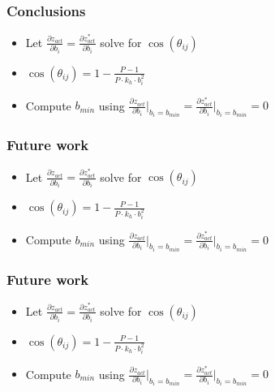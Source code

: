 \documentclass[xcolor=svgnames]{beamer}
\begin{document}
	\begin{frame}
	\frametitle{Conclusions}
	\begin{itemize}
	\item Let $\frac{\partial z_{act}}{\partial b_i} = \frac{\partial z_{act}^*}{\partial b_i}$ solve for $\cos (\theta_{ij})$
	\item $\cos (\theta_{ij}) = 1 - \frac{P-1}{P \cdot k_h \cdot b_i^2}$
	\item Compute $b_{min}$ using $\frac{\partial z_{act}}{\partial b_i} \Bigg|_{b_i = b_{min}} = \frac{\partial z_{act}^*}{\partial b_i} \Bigg|_{b_i = b_{min}} = 0$
	\end{itemize}
	\end{frame}

	\begin{frame}
	\frametitle{Future work}
	\begin{itemize}
	\item Let $\frac{\partial z_{act}}{\partial b_i} = \frac{\partial z_{act}^*}{\partial b_i}$ solve for $\cos (\theta_{ij})$
	\item $\cos (\theta_{ij}) = 1 - \frac{P-1}{P \cdot k_h \cdot b_i^2}$
	\item Compute $b_{min}$ using $\frac{\partial z_{act}}{\partial b_i} \Bigg|_{b_i = b_{min}} = \frac{\partial z_{act}^*}{\partial b_i} \Bigg|_{b_i = b_{min}} = 0$
	\end{itemize}
	\end{frame}

	\begin{frame}
	\frametitle{Future work}
	\begin{itemize}
	\item Let $\frac{\partial z_{act}}{\partial b_i} = \frac{\partial z_{act}^*}{\partial b_i}$ solve for $\cos (\theta_{ij})$
	\item $\cos (\theta_{ij}) = 1 - \frac{P-1}{P \cdot k_h \cdot b_i^2}$
	\item Compute $b_{min}$ using $\frac{\partial z_{act}}{\partial b_i} \Bigg|_{b_i = b_{min}} = \frac{\partial z_{act}^*}{\partial b_i} \Bigg|_{b_i = b_{min}} = 0$
	\end{itemize}
	\end{frame}
	
\end{document}
